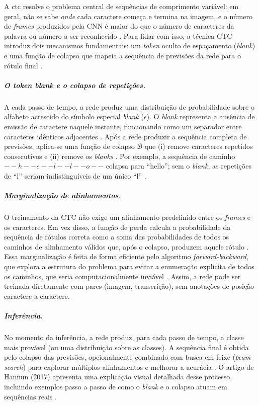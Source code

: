 A \gls{ctc} resolve o problema central de sequências de comprimento variável: 
em geral, não se sabe \textit{onde} cada caractere começa e termina na imagem, 
e o número de \textit{frames} produzidos pela CNN é maior do que o número de caracteres 
da palavra ou número a ser reconhecido \cite{graves2006ctc}. 
Para lidar com isso, a técnica CTC introduz dois mecanismos fundamentais: 
um \textit{token} oculto de espaçamento (\textit{blank}) e uma 
função de colapso que mapeia a sequência de previsões da rede 
para o rótulo final \cite{graves2006ctc, hannun2017ctc}.

\subparagraph{O \textit{token} \textit{blank} e o colapso de repetições.}
A cada passo de tempo, 
a rede produz uma distribuição de probabilidade sobre o alfabeto 
acrescido do símbolo especial \textit{blank} (\(\epsilon\)). 
O \textit{blank} representa a ausência de emissão de caractere naquele instante, 
funcionando como um separador entre caracteres idênticos adjacentes 
\cite{graves2006ctc}. 
Após a rede produzir a sequência completa de previsões, 
aplica-se uma função de colapso \(\mathcal{B}\) 
que (i) remove caracteres repetidos consecutivos e 
(ii) remove os \textit{blanks} \cite{hannun2017ctc}. 
Por exemplo, a sequência de caminho \(--h--e--l--l--o--\) colapsa 
para \(\text{``hello''}\); 
sem o \textit{blank}, as repetições de ``l'' seriam indistinguíveis de 
um único ``l'' \cite{hannun2017ctc}.

\subparagraph{Marginalização de alinhamentos.}
O treinamento da CTC não exige um alinhamento predefinido entre 
os \textit{frames} e os caracteres. Em vez disso, 
a função de perda calcula a probabilidade da sequência de rótulos correta como 
a soma das probabilidades de todos os caminhos de alinhamento válidos que, após o colapso, 
produzem aquele rótulo \cite{graves2006ctc}. 
Essa marginalização é feita de forma eficiente pelo algoritmo \textit{forward-backward}, 
que explora a estrutura do problema para evitar a 
enumeração explícita de todos os caminhos, 
que seria computacionalmente inviável \cite{graves2006ctc, hannun2017ctc}. 
Assim, a rede pode ser treinada diretamente com pares (imagem, transcrição), 
sem anotações de posição caractere a caractere.

\subparagraph{Inferência.}
No momento da inferência, a rede produz, para cada passo de tempo, 
a classe mais provável (ou uma distribuição sobre as classes). 
A sequência final é obtida pelo colapso das previsões, 
opcionalmente combinado com busca em feixe (\textit{beam search}) 
para explorar múltiplos alinhamentos e melhorar a acurácia \cite{hannun2017ctc}. 
O artigo de Hannun (2017) apresenta uma explicação visual detalhada desse processo, 
incluindo exemplos passo a passo de como o \textit{blank} e o 
colapso atuam em sequências reais \cite{hannun2017ctc}.

